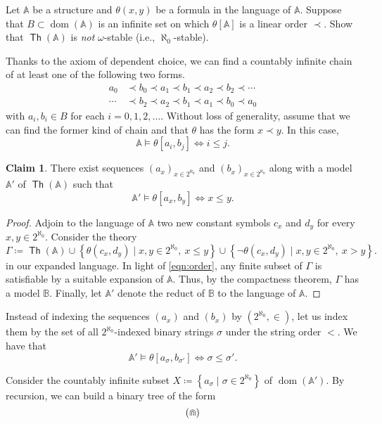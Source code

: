 \documentclass[10pt,letterpaper,cm]{nupset}
\theoremstyle{definition}
\theoremstyle{theorem}
\newtheorem{claim}{Claim}
\theoremstyle{remark}
\newcommand{\A}{\mathbb A}
\newcommand{\B}{\mathbb{B}}
\newcommand{\1}{\mathbb{1}}
\newcommand{\0}{\vec 0}
\DeclareMathOperator{\dom}{dom}
\DeclareMathOperator{\thh}{\mathsf{Th}}
\begin{document}
\begin{problem}[6.]
Let $\A$ be a structure and $\theta(x,y)$ be a formula in the language of $\A$. Suppose that $B\subset \dom(\A)$ is an infinite set on which $\theta[\A]$ is a linear order $\prec$. 
Show that $\thh(\A)$ is \emph{not} $\omega$-stable (i.e., $\aleph_0$-stable).
\end{problem}
\begin{solution}
Thanks to the axiom of dependent choice, we can find a countably infinite chain of at least one of the following two forms.
\begin{align*}
a_0 &\prec b_0\prec a_1 \prec b_1 \prec a_2 \prec b_2 \prec\cdots
\\ \cdots &\prec b_2 \prec a_2 \prec b_1 \prec a_1 \prec b_0 \prec a_0
\end{align*}   with $a_i, b_i\in B$ for each $i=0,1,2,\ldots$. Without loss of generality, assume that we can find the former kind of chain and that $\theta$ has the form $x\prec y$. In this case, 
\[ \label{eqn:order}
\A \models \theta[a_i, b_j] \iff i\leq j. \tag{$\ast$}
\] 

\begin{claim}
There exist sequences $\left(a_x\right)_{x\in 2^{\aleph_0}}$ and $\left(b_x\right)_{x\in 2^{\aleph_0}}$ along with a model $\A'$ of $\thh(\A)$ such that
\[
\A' \models \theta[a_x, b_y] \iff x \leq y.
\]
\end{claim}
\begin{proof}
Adjoin to the language of $\A$ two new constant symbols $c_x$ and $d_y$ for every $x,y\in 2^{\aleph_0}$. Consider the theory
\[
\Gamma \coloneqq \thh(\A) \cup \left\{  \theta(c_x, d_y) \mid x,y\in 2^{\aleph_0}, \ x \leq y  \right\} \cup \left\{ \neg{ \theta(c_x, d_y)}  \mid  x,y\in 2^{\aleph_0}, \ x > y\right\}.
\] in our expanded language. In light of \eqref{eqn:order}, any finite subset of $\Gamma$ is satisfiable by a suitable expansion of $\A$. Thus, by the compactness theorem, $\Gamma$ has a model $\B$. Finally, let $\A'$ denote the reduct of $\B$ to the language of $\A$.
\end{proof}

Instead of indexing the sequences $\left(a_x\right)$ and $\left(b_x\right)$ by $\left(2^{\aleph_0}, \in\right)$, let us index them by the set of all $2^{\aleph_0}$-indexed binary strings $\sigma$ under the string order $<$. We have that
\[
\A' \models \theta[a_{\sigma}, b_{\sigma'}] \iff \sigma \leq \sigma'.
\] 

Consider the countably infinite subset $X\coloneqq  \left\{a_{\sigma} \mid \sigma \in 2^{\aleph_0}\right\}$ of $\dom(\A')$. By recursion, we can build a binary tree of the form
\[ \label{eqn:tree} \tag{$\Cap$}
\begin{tikzpicture}[level distance=1.8cm,
level 1/.style={sibling distance=7.8cm},
level 2/.style={sibling distance=4cm},
level 3/.style={sibling distance=2cm}]
\tikzstyle{every node}=[draw=none]


\end{tikzpicture}\]
\end{solution}
\end{document}
